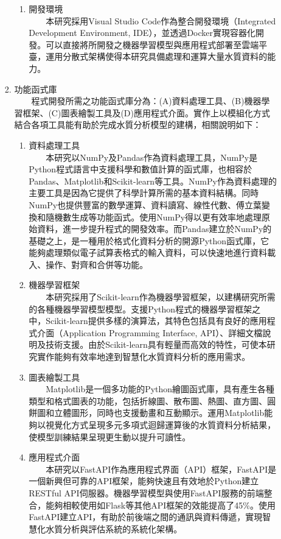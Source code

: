 \documentclass[12pt,a4paper]{article}
\begin{document}
\begin{enumerate}
\begin{enumerate}[label=\arabic*.]
\begin{enumerate}[label=2-1-\arabic*.]
\begin{enumerate}[label=\Alph*.]
                        \item 開發環境\\
                        　　本研究採用Visual Studio Code作為整合開發環境（Integrated Development Environment, IDE），並透過Docker實現容器化開發。可以直接將所開發之機器學習模型與應用程式部署至雲端平臺，運用分散式架構使得本研究具備處理和運算大量水質資料的能力。
                    \end{enumerate}
        \item 功能函式庫\\
        　　程式開發所需之功能函式庫分為：(A)資料處理工具、(B)機器學習框架、(C)圖表繪製工具及(D)應用程式介面。實作上以模組化方式結合各項工具能有助於完成水質分析模型的建構，相關說明如下：
            \begin{enumerate}[label=\Alph*.]
                \item 資料處理工具\\
                　　本研究以NumPy及Pandas作為資料處理工具，NumPy是Python程式語言中支援科學和數值計算的函式庫，也相容於Pandas、Matplotlib和Scikit-learn等工具\cite{ref14}。NumPy作為資料處理的主要工具是因為它提供了科學計算所需的基本資料結構\cite{ref15}。同時NumPy也提供豐富的數學運算、資料讀寫、線性代數、傅立葉變換和隨機數生成等功能函式\cite{ref16}。使用NumPy得以更有效率地處理原始資料，進一步提升程式的開發效率。而Pandas建立於NumPy的基礎之上，是一種用於格式化資料分析的開源Python函式庫，它能夠處理類似電子試算表格式的輸入資料，可以快速地進行資料載入、操作、對齊和合併等功能\cite{ref17}。
                \item 機器學習框架\\
                　　本研究採用了Scikit-learn作為機器學習框架，以建構研究所需的各種機器學習模型模型\cite{ref18}。支援Python程式的機器學習框架之中，Scikit-learn提供多樣的演算法，其特色包括具有良好的應用程式介面（Application Programming Interface, API）、詳細文檔說明及技術支援\cite{ref19}。由於Scikit-learn具有輕量而高效的特性，可使本研究實作能夠有效率地達到智慧化水質資料分析的應用需求。
                \item 圖表繪製工具\\
                　　Matplotlib是一個多功能的Python繪圖函式庫，具有產生各種類型和格式圖表的功能，包括折線圖、散布圖、熱圖、直方圖、圓餅圖和立體圖形，同時也支援動畫和互動顯示\cite{ref20}。運用Matplotlib能夠以視覺化方式呈現多元多項式迴歸運算後的水質資料分析結果，使模型訓練結果呈現更生動以提升可讀性。
                \item 應用程式介面\\
                　　本研究以FastAPI作為應用程式界面（API）框架，FastAPI是一個新興但可靠的API框架\cite{ref21}，能夠快速且有效地於Python建立RESTful API伺服器。機器學習模型與使用FastAPI服務的前端整合，能夠相較使用如Flask等其他API框架的效能提高了45\%\cite{ref22}。使用FastAPI建立API，有助於前後端之間的通訊與資料傳遞，實現智慧化水質分析與評估系統的系統化架構。

\end{enumerate}
\end{enumerate}
\end{enumerate}
\end{enumerate}
\end{document}
